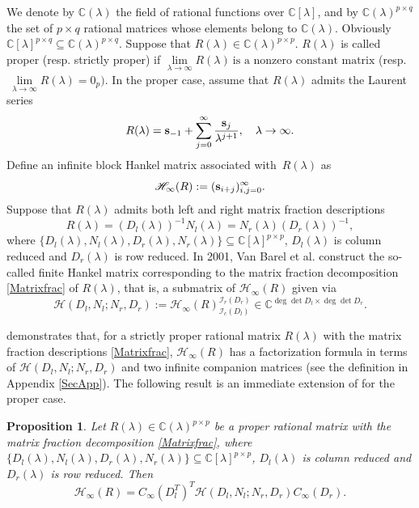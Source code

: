 \documentclass[12pt,reqno]{amsart}
\theoremstyle{plain}
\newtheorem{proposition}[theorem]{Proposition}
\numberwithin{equation}{section}
\theoremstyle{remark}
\begin{document}
We denote by $\mathbb C(\lambda)$ the field of rational functions over $\mathbb C[\lambda]$, and by $\mathbb C(\lambda)^{p\times q}$ the set of $p\times q$ rational matrices whose  elements belong to $\mathbb C(\lambda)$. Obviously $\mathbb C[\lambda]^{p\times q}\subseteq \mathbb C(\lambda)^{p\times q}$.
Suppose that $R(\lambda)\in \mathbb C(\lambda)^{p\times p}$.  $R(\lambda)$ is called proper (resp. strictly proper) if 
$
\lim \limits_{\lambda\rightarrow \infty} R(\lambda)\ \mbox{is a nonzero constant matrix}$
(resp.$\ \lim \limits_{\lambda\rightarrow \infty} R(\lambda)=0_p).
$
In the proper case, assume that $R(\lambda)$ admits the Laurent series
\begin{equation}\label{LaurentSeriesRsp}
       R(\lambda)={\bf s}_{-1}+\sum_{j=0}^{\infty} \frac{{\bf s}_j}{\lambda^{j+1}},\quad \lambda\rightarrow \infty.
     \end{equation}
Define an infinite block Hankel matrix associated with~$R(\lambda)$ as
$$
\mathscr{H}_{\infty}(R):=({\bf s}_{i+j})_{i,j=0}^{\infty}.
$$
Suppose that $R(\lambda)$ admits both left and right matrix fraction descriptions
\begin{equation}\label{Matrixfrac}
R(\lambda)=(D_l(\lambda))^{-1}N_l(\lambda)=N_r(\lambda)(D_r(\lambda))^{-1},
\end{equation}
where $\{D_l(\lambda), N_l(\lambda), D_r(\lambda), N_r(\lambda)\}\subseteq \mathbb C[\lambda]^{p\times p}$, $D_l(\lambda)$ is column reduced and $D_r(\lambda)$ is row reduced. 
In 2001, Van Barel et al. \cite{BPV} construct the so-called finite Hankel matrix corresponding to the matrix fraction decomposition \eqref{Matrixfrac} of $R(\lambda)$, that is,
a submatrix of $\mathscr{H}_{\infty}(R)$ given via 
$$
\mathscr{H}(D_l,N_l;N_r,D_r):=\mathscr{H}_{\infty}(R)^{\mathcal I_r(D_r)}_{\mathcal I_c(D_l)}\in \mathbb C^{\deg \det D_l\times \deg \det D_r}.
$$ 

\cite[Theorem 50]{BPV1999} demonstrates that, for a strictly proper rational matrix $R(\lambda)$ with the matrix fraction descriptions \eqref{Matrixfrac},
$\mathscr{H}_{\infty}(R)$ has a factorization formula in terms of $\mathscr{H}(D_l,N_l;N_r,D_r)$ and two infinite  companion matrices (see the definition in Appendix \ref{SecApp}). 
The following result is an immediate extension of \cite[Theorem 50]{BPV1999} for the proper case. 
\begin{proposition}\label{ProHinfty}
Let $R(\lambda)\in \mathbb C(\lambda)^{p\times p}$ be a proper rational matrix with the matrix fraction decomposition \eqref{Matrixfrac}, where $\{D_l(\lambda), N_l(\lambda), D_r(\lambda), N_r(\lambda)\}\subseteq \mathbb C[\lambda]^{p\times p}$, $D_l(\lambda)$ is column reduced and $D_r(\lambda)$ is row reduced. 
Then 
$$
\mathscr{H}_{\infty}(R)=C_{\infty}(D_l^T)^T \mathscr{H}(D_l,N_l;N_r,D_r) C_{\infty}(D_r). 
$$
\end{proposition}
\end{document}
